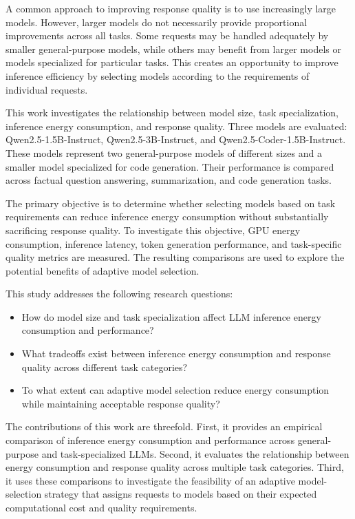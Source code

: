 \documentclass[conference]{IEEEtran}
\begin{document}
A common approach to improving response quality is to use increasingly
large models. However, larger models do not necessarily provide
proportional improvements across all tasks. Some requests may be
handled adequately by smaller general-purpose models, while others
may benefit from larger models or models specialized for particular
tasks. This creates an opportunity to improve inference efficiency by
selecting models according to the requirements of individual requests.

This work investigates the relationship between model size, task
specialization, inference energy consumption, and response quality.
Three models are evaluated: Qwen2.5-1.5B-Instruct,
Qwen2.5-3B-Instruct, and Qwen2.5-Coder-1.5B-Instruct. These models
represent two general-purpose models of different sizes and a smaller
model specialized for code generation. Their performance is compared
across factual question answering, summarization, and code generation
tasks.

The primary objective is to determine whether selecting models based
on task requirements can reduce inference energy consumption without
substantially sacrificing response quality. To investigate this
objective, GPU energy consumption, inference latency, token
generation performance, and task-specific quality metrics are
measured. The resulting comparisons are used to explore the potential
benefits of adaptive model selection.

This study addresses the following research questions:

\begin{itemize}
    \item How do model size and task specialization affect
    LLM inference energy consumption and performance?
    \item What tradeoffs exist between inference energy
    consumption and response quality across different task categories?
    \item To what extent can adaptive model selection
    reduce energy consumption while maintaining acceptable response
    quality?
\end{itemize}

The contributions of this work are threefold. First, it provides an
empirical comparison of inference energy consumption and performance
across general-purpose and task-specialized LLMs. Second, it evaluates
the relationship between energy consumption and response quality
across multiple task categories. Third, it uses these comparisons to
investigate the feasibility of an adaptive model-selection strategy
that assigns requests to models based on their expected computational
cost and quality requirements.
\end{document}
